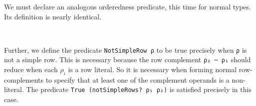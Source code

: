 \documentclass[authoryear, acmsmall, screen, review, nonacm]{acmart} %
\begin{document}
We must declare an analogous orderedness predicate, this time for normal types. Its definition is nearly identical.

\begin{code}%
\>[0]\AgdaSpace{}%
\AgdaSymbol{:}\AgdaSpace{}%
\AgdaSpace{}%
\AgdaSpace{}%
\AgdaSpace{}%
\AgdaOperator{\AgdaInductiveConstructor{R[}}\AgdaSpace{}%
\AgdaSpace{}%
\AgdaOperator{\AgdaInductiveConstructor{]}}\AgdaSpace{}%
\AgdaSpace{}%
\<%
\\
\>[0]\AgdaSpace{}%
\AgdaSymbol{:}\AgdaSpace{}%
\AgdaSpace{}%
\AgdaSymbol{(}\AgdaSpace{}%
\AgdaSymbol{:}\AgdaSpace{}%
\AgdaSpace{}%
\AgdaSpace{}%
\AgdaSpace{}%
\AgdaOperator{\AgdaInductiveConstructor{R[}}\AgdaSpace{}%
\AgdaSpace{}%
\AgdaOperator{\AgdaInductiveConstructor{]}}\AgdaSymbol{)}\AgdaSpace{}%
\AgdaSpace{}%
\AgdaSpace{}%
\AgdaSymbol{(}\AgdaSpace{}%
\AgdaSymbol{)}\<%
\end{code}

Further, we define the predicate \verb!NotSimpleRow ρ! to be true precisely when \verb!ρ! is not a simple row. This is necessary because the row complement \verb!ρ₂ ─ ρ₁! should reduce when each $\rho_i$ is a row literal. So it is necessary when forming normal row-complements to specify that at least one of the complement operands is a non-literal. The predicate \verb!True (notSimpleRows? ρ₁ ρ₂)! is satisfied precisely in this case.

\begin{code}%
\>[0]\AgdaSpace{}%
\AgdaSymbol{:}\AgdaSpace{}%
\AgdaSpace{}%
\AgdaSpace{}%
\AgdaOperator{\AgdaInductiveConstructor{R[}}\AgdaSpace{}%
\AgdaSpace{}%
\AgdaOperator{\AgdaInductiveConstructor{]}}\AgdaSpace{}%
\AgdaSpace{}%
\<%
\\
\>[0]\AgdaSpace{}%
\AgdaSymbol{:}%
\>[2746I]\AgdaSpace{}%
\AgdaSymbol{(}\AgdaSpace{}%
\AgdaSpace{}%
\AgdaSymbol{:}\AgdaSpace{}%
\AgdaSpace{}%
\AgdaSpace{}%
\AgdaOperator{\AgdaInductiveConstructor{R[}}\AgdaSpace{}%
\AgdaSpace{}%
\AgdaOperator{\AgdaInductiveConstructor{]}}\AgdaSymbol{)}\AgdaSpace{}%
\<%
\\
\>[.][@{}l@{}]\<[2746I]%
\>[17]\AgdaSpace{}%
\AgdaSymbol{(}\AgdaSpace{}%
\AgdaSpace{}%
\AgdaSpace{}%
\AgdaSpace{}%
\AgdaSymbol{)}\<%
\end{code}
\end{document}
